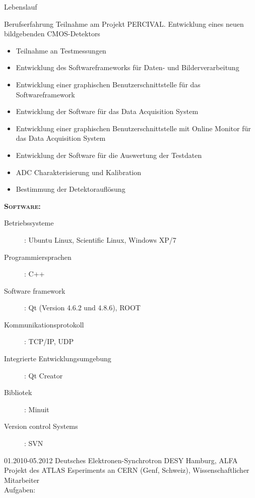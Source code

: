 \documentclass[11pt,a4paper]{scrartcl}
\begin{document}
\begin{cv}{Lebenslauf}
\begin{cvlist}{Berufserfahrung}
Teilnahme am Projekt PERCIVAL. Entwicklung eines neuen
bildgebenden CMOS-Detektors
\begin{itemize}
  \item Teilnahme an Testmessungen
  \item Entwicklung des Softwareframeworks f{\"u}r Daten- und
  Bilderverarbeitung
  \item Entwicklung einer graphischen Benutzerschnittstelle f{\"u}r  das Softwareframework
  \item Entwicklung der Software f{\"u}r das Data Acquisition
  System
  \item Entwicklung einer graphischen Benutzerschnittstelle mit Online
  Monitor f{\"u}r das Data Acquisition System
  \item Entwicklung der Software f{\"u}r die Auswertung der Testdaten
  \item ADC Charakterisierung und Kalibration
  \item Bestimmung der Detektoraufl{\"o}sung
\end{itemize}

{\scshape {\bfseries Software:}}
\begin{description}
\item[Betriebssysteme] : Ubuntu Linux, Scientific Linux, Windows
XP/7
\item[Programmiersprachen] : C++
\item[Software framework] : Qt (Version 4.6.2 und 4.8.6), ROOT
 \item[Kommunikationsprotokoll] : TCP/IP, UDP
\item[Integrierte Entwicklungsumgebung] : Qt Creator
\item[Bibliotek] : Minuit
\item[Version control Systems] : SVN
\end{description}

\vspace{\baselineskip}

\item[01.2010-05.2012] Deutsches Elektronen-Synchrotron DESY
Hamburg, ALFA Projekt des ATLAS Esperiments an CERN (Genf,
Schweiz), Wissenschaftlicher Mitarbeiter \\

Aufgaben:\\


\end{cvlist}
\end{cv}
\end{document}
